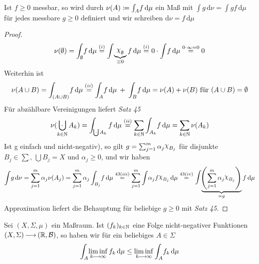 \documentclass[skript.tex]{subfiles}
\begin{document}
	\begin{lem}
		Ist $f\geq 0$ messbar, so wird durch $\nu(A)\coloneqq\int_A \! f \, \mathrm{d}\mu$ ein Maß mit $\int \! g \, \mathrm{d}\nu=\int \! g f \, \mathrm{d}\mu$ für jedes messbare $g\geq 0$ definiert und wir schreiben $\mathrm{d}\nu=f\, \mathrm{d}\mu$
	\end{lem}
	\begin{proof}
		\begin{equation*}
			\nu(\emptyset)=\int_{\emptyset} \! f \, \mathrm{d}\mu \stackrel{(i)}=\int \! \underbrace{\rchi_\emptyset}_{\equiv 0}f \, \mathrm{d}\mu \stackrel{(i)}=0\cdot \int \! f \, \mathrm{d}\mu \stackrel{0\cdot\infty=0}=0
		\end{equation*}
		Weiterhin ist
		\begin{equation*}
			\nu(A\cup B)=\int_{(A\cup B)} \! f \, \mathrm{d}\mu \stackrel{(ii)}=\int_A \! f \, \mathrm{d}\mu \: + \: \int_B \! f \, \mathrm{d}\mu = \nu(A)+\nu(B)$ für $(A\cup B) = \es
		\end{equation*}
		Für abzählbare Vereinigungen liefert \textit{Satz 45}
		\begin{equation*}
			\nu(\bigcupdot_{k\in\N}A_k)=\int_{\bigcupdot A_k} f \, \mathrm{d}\mu \stackrel{(ii)}= \sum_{k\in\N}\int_{A_k} \! f \, \mathrm{d}\mu=\sum_{k\in\N} \nu(A_k)
		\end{equation*}
		Ist g einfach und nicht-negativ), so gilt $g=\sum_{j=1}^{m} \alpha_j \rchi_{B_j}$ für disjunkte $B_j\in\sum, \, \bigcup B_j=X$ und $\alpha_j\geq 0$, und wir haben
		\begin{equation*}
		\int \! g \, \mathrm{d}\nu= \sum_{j=1}^{m} \alpha_j \nu(A_j)=\sum_{j=1}^{m} \alpha_j \int_{B_j} \! f \, \mathrm{d}\mu \stackrel{43(iii)}= \sum_{j=1}^{m}\int \! \alpha_j f \rchi_{B_j} \, \mathrm{d}\mu \stackrel{43(iv)}= \mathlarger{\mathlarger{\int}} \! \underbrace{\pr{\sum_{j=1}^{m}\alpha_j \rchi_{B_j}}}_{=g}f \, \mathrm{d}\mu
		\end{equation*}
		Approximation liefert die Behauptung für beliebige $g\geq0$ mit \textit{Satz 45}.
		\end{proof}

		\begin{theorem}
			Sei $(X,\Sigma,\mu)$ ein Maßraum. Ist $(f_k)_{k\in\mathbb{N}}$ eine Folge nicht-negativer Funktionen $(X,\Sigma) \kern -1pt \longrightarrow \kern -1pt (\mathbb{R}, \mathcal{B})$, so haben wir für ein beliebiges $A\in\Sigma$
			\begin{equation*}
				\int_A \! \liminf_{k\kern -1pt \longrightarrow \kern -1pt\infty} f_k \, \mathrm{d}\mu \leq \liminf_{k\kern -1pt \longrightarrow \kern -1pt\infty}\int_A \! f_k \, \mathrm{d}\mu
			\end{equation*}
		\end{theorem}
\end{document}
